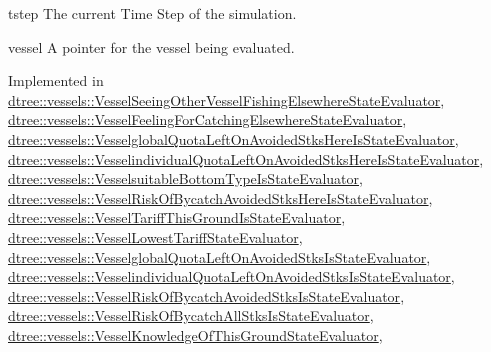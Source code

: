 \begin{DoxyItemize}
\item tstep The current Time Step of the simulation. \item vessel A pointer for the vessel being evaluated. \end{DoxyItemize}


Implemented in \mbox{\hyperlink{classdtree_1_1vessels_1_1_vessel_seeing_other_vessel_fishing_elsewhere_state_evaluator_a76fa5431cd08865992d55357684cd7a2}{dtree\+::vessels\+::\+Vessel\+Seeing\+Other\+Vessel\+Fishing\+Elsewhere\+State\+Evaluator}}, \mbox{\hyperlink{classdtree_1_1vessels_1_1_vessel_feeling_for_catching_elsewhere_state_evaluator_af1b9d9f55de1ecf86bce4dd834ec9da3}{dtree\+::vessels\+::\+Vessel\+Feeling\+For\+Catching\+Elsewhere\+State\+Evaluator}}, \mbox{\hyperlink{classdtree_1_1vessels_1_1_vesselglobal_quota_left_on_avoided_stks_here_is_state_evaluator_a1a1659981d3f532ad0ebf39e589e8ebf}{dtree\+::vessels\+::\+Vesselglobal\+Quota\+Left\+On\+Avoided\+Stks\+Here\+Is\+State\+Evaluator}}, \mbox{\hyperlink{classdtree_1_1vessels_1_1_vesselindividual_quota_left_on_avoided_stks_here_is_state_evaluator_a7d3f3c7db7b95a687cc4105b81c0f7f0}{dtree\+::vessels\+::\+Vesselindividual\+Quota\+Left\+On\+Avoided\+Stks\+Here\+Is\+State\+Evaluator}}, \mbox{\hyperlink{classdtree_1_1vessels_1_1_vesselsuitable_bottom_type_is_state_evaluator_ac002cecd3e2814b923a2e990c73cb0c9}{dtree\+::vessels\+::\+Vesselsuitable\+Bottom\+Type\+Is\+State\+Evaluator}}, \mbox{\hyperlink{classdtree_1_1vessels_1_1_vessel_risk_of_bycatch_avoided_stks_here_is_state_evaluator_a8b75337fe22382e6878459887b758116}{dtree\+::vessels\+::\+Vessel\+Risk\+Of\+Bycatch\+Avoided\+Stks\+Here\+Is\+State\+Evaluator}}, \mbox{\hyperlink{classdtree_1_1vessels_1_1_vessel_tariff_this_ground_is_state_evaluator_afd65c12067b4bfd61b1554a97e77268e}{dtree\+::vessels\+::\+Vessel\+Tariff\+This\+Ground\+Is\+State\+Evaluator}}, \mbox{\hyperlink{classdtree_1_1vessels_1_1_vessel_lowest_tariff_state_evaluator_a3dafcca2d3db56b18fb5c42199b2e1ec}{dtree\+::vessels\+::\+Vessel\+Lowest\+Tariff\+State\+Evaluator}}, \mbox{\hyperlink{classdtree_1_1vessels_1_1_vesselglobal_quota_left_on_avoided_stks_is_state_evaluator_a272ce0067644fd5a3ad52c37f9f40ae2}{dtree\+::vessels\+::\+Vesselglobal\+Quota\+Left\+On\+Avoided\+Stks\+Is\+State\+Evaluator}}, \mbox{\hyperlink{classdtree_1_1vessels_1_1_vesselindividual_quota_left_on_avoided_stks_is_state_evaluator_a946ed372cfcc94aeeb9f4c390cfc14bf}{dtree\+::vessels\+::\+Vesselindividual\+Quota\+Left\+On\+Avoided\+Stks\+Is\+State\+Evaluator}}, \mbox{\hyperlink{classdtree_1_1vessels_1_1_vessel_risk_of_bycatch_avoided_stks_is_state_evaluator_a12997277339c2d910e6136fee1923044}{dtree\+::vessels\+::\+Vessel\+Risk\+Of\+Bycatch\+Avoided\+Stks\+Is\+State\+Evaluator}}, \mbox{\hyperlink{classdtree_1_1vessels_1_1_vessel_risk_of_bycatch_all_stks_is_state_evaluator_afcb57e2105f10d85e9f6955762064046}{dtree\+::vessels\+::\+Vessel\+Risk\+Of\+Bycatch\+All\+Stks\+Is\+State\+Evaluator}}, \mbox{\hyperlink{classdtree_1_1vessels_1_1_vessel_knowledge_of_this_ground_state_evaluator_aca0d591380daef97acd9034914f54499}{dtree\+::vessels\+::\+Vessel\+Knowledge\+Of\+This\+Ground\+State\+Evaluator}}, 